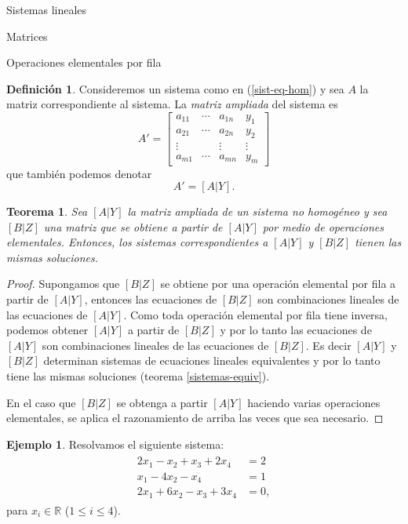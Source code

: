 \documentclass[a4paper,12pt,twoside,spanish]{amsbook}
\newtheorem{teorema}{Teorema}[section]
\theoremstyle{definition}
\newtheorem{definicion}{Definici\'on}[section]
\newtheorem{ejemplo}{Ejemplo}[section]
\theoremstyle{remark}
\newcommand{\R}{\mathbb R}
\begin{document}
\begin{chapter}{Sistemas lineales}
\begin{section}{Matrices}
\begin{subsection}{Operaciones elementales por fila}
					
				\begin{definicion}
					Consideremos un sistema como en (\ref{sist-eq-hom}) y sea  $A$ la matriz correspondiente al sistema. La \textit{matriz  ampliada} del sistema es 
					\begin{equation}\label{mtrx-ampliada}
					A' = \left[\begin{array}{ccc|c}  
					a_{11} & \cdots & a_{1n} &  y_1 \\
					a_{21} & \cdots & a_{2n} &  y_2 \\
					\vdots &  & \vdots  &  \vdots  \\
					a_{m1} & \cdots & a_{mn} &  y_m 
					\end{array}\right]
					\end{equation}
					que también podemos denotar
					\begin{equation*}
					A' = [A | Y].
					\end{equation*}
				\end{definicion}
				
				
				\begin{teorema}\label{th-equiv-op-elem} Sea $[A | Y]$ la matriz ampliada de un sistema no homogéneo y sea $[B | Z]$ una matriz que se obtiene a partir de $[A | Y]$ por medio de operaciones elementales. Entonces, los sistemas correspondientes a $[A | Y]$ y  $[B | Z]$ tienen las mismas soluciones. 
			\end{teorema}
			\begin{proof}
				 Supongamos que $[B | Z]$ se obtiene por una operación elemental por fila a partir de $[A | Y]$,  entonces las ecuaciones de $[B | Z]$ son combinaciones lineales de las ecuaciones de $[A | Y]$. Como toda operación elemental por fila tiene inversa, podemos obtener $[A | Y]$ a partir de $[B | Z]$ y por lo tanto las ecuaciones de $[A | Y]$ son combinaciones lineales de las ecuaciones de $[B | Z]$. Es decir $[A | Y]$ y $[B | Z]$ determinan sistemas de ecuaciones lineales equivalentes y por lo tanto tiene las mismas soluciones (teorema \ref{sistemas-equiv}).
				 
				 En el caso que $[B | Z]$ se obtenga a partir $[A | Y]$ haciendo varias operaciones elementales,  se aplica el razonamiento de arriba las veces que sea necesario. 
			\end{proof}
				
				\begin{ejemplo}\label{ejemplo2.11}
					Resolvamos el siguiente sistema:
					\begin{align}\label{sist-eq-01}
					\begin{split}
					2x_1 - x_2 + x_3 + 2x_4 &= 2 \\
					x_1 - 4x_2 -x_4 &=1 \\
					2x_1 +6x_2 -x_3 +3x_4 &= 0,  
					\end{split}
					\end{align}
					para  $x_i \in \R$ ($1 \le i \le 4$). 
				

\end{ejemplo}
\end{subsection}
\end{section}
\end{chapter}
\end{document}
